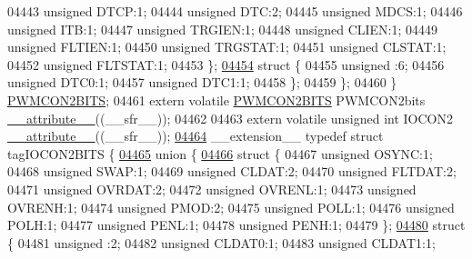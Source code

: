\begin{DoxyCode}
04443       \textcolor{keywordtype}{unsigned} DTCP:1;
04444       \textcolor{keywordtype}{unsigned} DTC:2;
04445       \textcolor{keywordtype}{unsigned} MDCS:1;
04446       \textcolor{keywordtype}{unsigned} ITB:1;
04447       \textcolor{keywordtype}{unsigned} TRGIEN:1;
04448       \textcolor{keywordtype}{unsigned} CLIEN:1;
04449       \textcolor{keywordtype}{unsigned} FLTIEN:1;
04450       \textcolor{keywordtype}{unsigned} TRGSTAT:1;
04451       \textcolor{keywordtype}{unsigned} CLSTAT:1;
04452       \textcolor{keywordtype}{unsigned} FLTSTAT:1;
04453     \};
\hypertarget{a00009_source_l04454}{}\hyperlink{a00009}{04454}     \textcolor{keyword}{struct }\{
04455       \textcolor{keywordtype}{unsigned} :6;
04456       \textcolor{keywordtype}{unsigned} DTC0:1;
04457       \textcolor{keywordtype}{unsigned} DTC1:1;
04458     \};
04459   \};
04460 \} \hyperlink{a00008_d6/da1/a00675}{PWMCON2BITS};
04461 \textcolor{keyword}{extern} \textcolor{keyword}{volatile} \hyperlink{a00008_d6/da1/a00675}{PWMCON2BITS} PWMCON2bits \hyperlink{a00009_a493c46f03454991ccc5aa7a6e1dfb2a7}{\_\_attribute\_\_}((\_\_sfr\_\_));
04462 
04463 \textcolor{keyword}{extern} \textcolor{keyword}{volatile} \textcolor{keywordtype}{unsigned} \textcolor{keywordtype}{int}  IOCON2 \hyperlink{a00009_a493c46f03454991ccc5aa7a6e1dfb2a7}{\_\_attribute\_\_}((\_\_sfr\_\_));
\hypertarget{a00009_source_l04464}{}\hyperlink{a00008}{04464} \_\_extension\_\_ \textcolor{keyword}{typedef} \textcolor{keyword}{struct }tagIOCON2BITS \{
\hypertarget{a00009_source_l04465}{}\hyperlink{a00009}{04465}   \textcolor{keyword}{union }\{
\hypertarget{a00009_source_l04466}{}\hyperlink{a00009}{04466}     \textcolor{keyword}{struct }\{
04467       \textcolor{keywordtype}{unsigned} OSYNC:1;
04468       \textcolor{keywordtype}{unsigned} SWAP:1;
04469       \textcolor{keywordtype}{unsigned} CLDAT:2;
04470       \textcolor{keywordtype}{unsigned} FLTDAT:2;
04471       \textcolor{keywordtype}{unsigned} OVRDAT:2;
04472       \textcolor{keywordtype}{unsigned} OVRENL:1;
04473       \textcolor{keywordtype}{unsigned} OVRENH:1;
04474       \textcolor{keywordtype}{unsigned} PMOD:2;
04475       \textcolor{keywordtype}{unsigned} POLL:1;
04476       \textcolor{keywordtype}{unsigned} POLH:1;
04477       \textcolor{keywordtype}{unsigned} PENL:1;
04478       \textcolor{keywordtype}{unsigned} PENH:1;
04479     \};
\hypertarget{a00009_source_l04480}{}\hyperlink{a00009}{04480}     \textcolor{keyword}{struct }\{
04481       \textcolor{keywordtype}{unsigned} :2;
04482       \textcolor{keywordtype}{unsigned} CLDAT0:1;
04483       \textcolor{keywordtype}{unsigned} CLDAT1:1;

\end{DoxyCode}
